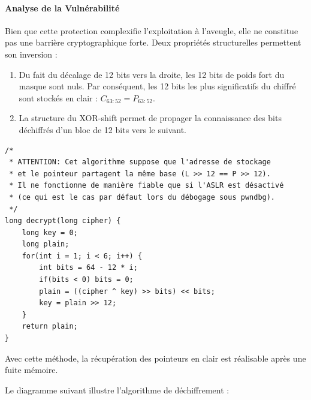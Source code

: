 \paragraph{Analyse de la Vulnérabilité}
Bien que cette protection complexifie l'exploitation à l'aveugle, elle ne constitue pas une barrière cryptographique forte. Deux propriétés structurelles permettent son inversion :
\begin{enumerate}
    \item Du fait du décalage de 12 bits vers la droite, les 12 bits de poids fort du masque sont nuls. Par conséquent, les 12 bits les plus significatifs du chiffré sont stockés en clair : $C_{63:52} = P_{63:52}$.
    \item La structure du XOR-shift permet de propager la connaissance des bits déchiffrés d'un bloc de 12 bits vers le suivant.
\end{enumerate}

\begin{verbatim}
/* 
 * ATTENTION: Cet algorithme suppose que l'adresse de stockage 
 * et le pointeur partagent la même base (L >> 12 == P >> 12).
 * Il ne fonctionne de manière fiable que si l'ASLR est désactivé 
 * (ce qui est le cas par défaut lors du débogage sous pwndbg).
 */
long decrypt(long cipher) {
    long key = 0;
    long plain;
    for(int i = 1; i < 6; i++) {
        int bits = 64 - 12 * i;
        if(bits < 0) bits = 0;
        plain = ((cipher ^ key) >> bits) << bits;
        key = plain >> 12;
    }
    return plain;
}
\end{verbatim}

Avec cette méthode, la récupération des pointeurs en clair est réalisable après une fuite mémoire.

Le diagramme suivant illustre l'algorithme de déchiffrement :

